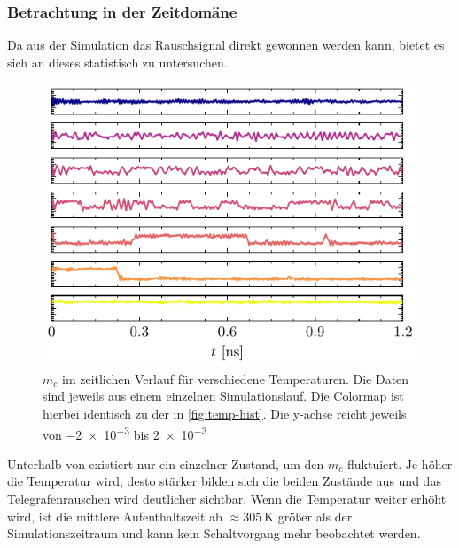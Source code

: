 \documentclass[main.tex]{subfiles}
\begin{document}
\subsubsection{Betrachtung in der Zeitdomäne}

Da aus der Simulation das Rauschsignal direkt gewonnen werden kann, bietet es sich an dieses statistisch zu untersuchen.

\begin{figure}[H]
    \centering
    \includegraphics{bilder/plots/temp_comparison_long/mc_time.pdf}
    \caption{\(m_c\) im zeitlichen Verlauf für verschiedene Temperaturen. Die Daten sind jeweils aus einem einzelnen Simulationslauf. Die Colormap ist hierbei identisch zu der in \cref{fig:temp-hist}. Die y-achse reicht jeweils von \num{-2e-3} bis \num{+2e-3}}\label{fig:temp-time}
\end{figure}

Unterhalb von  existiert nur ein einzelner Zustand, um den \(m_c\) fluktuiert. Je höher die Temperatur wird, desto stärker bilden sich die beiden Zustände aus und das Telegrafenrauschen wird deutlicher sichtbar. Wenn die Temperatur weiter erhöht wird, ist die mittlere Aufenthaltszeit ab \(\approx\SI{305}{\kelvin}\) größer als der Simulationszeitraum und kann kein Schaltvorgang mehr beobachtet werden.
\end{document}
